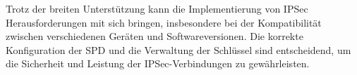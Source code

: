 Trotz der breiten Unterstützung kann die Implementierung von \gls{IPSec} Herausforderungen mit sich bringen, insbesondere bei der Kompatibilität zwischen verschiedenen Geräten und Softwareversionen. Die korrekte Konfiguration der \gls{SPD} und die Verwaltung der Schlüssel sind entscheidend, um die Sicherheit und Leistung der \gls{IPSec}-Verbindungen zu gewährleisten.

